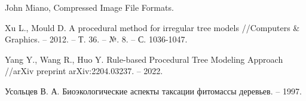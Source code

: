 \begin{thebibliography}{100}
John Miano, Compressed Image File Formats.


Xu L., Mould D. A procedural method for irregular tree models //Computers \& Graphics. – 2012. – Т. 36. – №. 8. – С. 1036-1047.

Yang Y., Wang R., Huo Y. Rule-based Procedural Tree Modeling Approach //arXiv preprint arXiv:2204.03237. – 2022.

Усольцев В. А. Биоэкологические аспекты таксации фитомассы деревьев. – 1997.


\end{thebibliography}

\newpage
